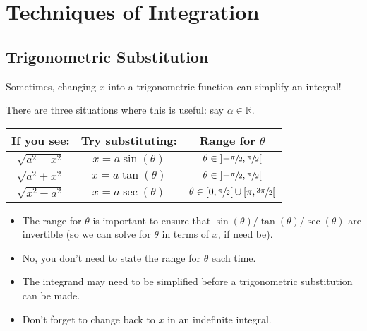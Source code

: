 \chapter{Techniques of Integration}
\section{Trigonometric Substitution}
Sometimes, changing $ x $ into a trigonometric function can
simplify an integral!

There are three situations where this is useful: say $ \alpha\in\mathbb{R} $.

\begin{table}[!htbp]
    \centering
    \begin{tabular}{ccc}
        If you see:        & Try substituting:   & Range for $ \theta $                                                                                 \\
        \midrule
        $ \sqrt{a^2-x^2} $ & $ x=a\sin(\theta) $ & $ \theta\in\interval[open]{-\sfrac{\pi}{2}}{\sfrac{\pi}{2}} $                                        \\
        $ \sqrt{a^2+x^2} $ & $ x=a\tan(\theta) $ & $ \theta\in\interval[open]{-\sfrac{\pi}{2}}{\sfrac{\pi}{2}} $                                        \\
        $ \sqrt{x^2-a^2} $ & $ x=a\sec(\theta) $ & $ \theta\in\interval[open right]{0}{\sfrac{\pi}{2}}\cup\interval[open right]{\pi}{\sfrac{3\pi}{2}} $
    \end{tabular}
\end{table}

\begin{Remark}{}{}
    \begin{itemize}
        \item The range for $ \theta $ is important to ensure that
              $ \sin(\theta)/\tan(\theta)/\sec(\theta) $ are invertible (so we can
              solve for $ \theta $ in terms of $ x $, if need be).
        \item No, you don't need to state the range for $ \theta $ each time.
        \item The integrand may need to be simplified before a trigonometric substitution
              can be made.
        \item Don't forget to change back to $ x $ in an indefinite integral.
    \end{itemize}
\end{Remark}

